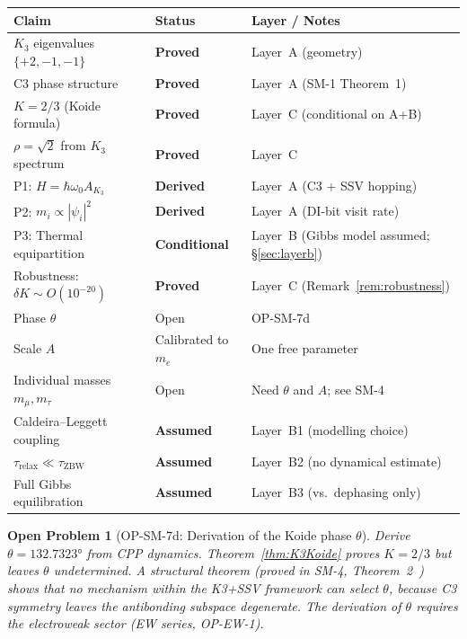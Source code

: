 \documentclass[11pt]{article}
\newtheorem{openproblem}{Open Problem}
\begin{document}
\begin{center}
\renewcommand{\arraystretch}{1.2}
\begin{tabular}{p{5.5cm}lp{5.5cm}}
\toprule
Claim & Status & Layer / Notes \\
\midrule
$K_3$ eigenvalues $\{+2,-1,-1\}$ & \textbf{Proved} & Layer~A (geometry) \\
C3 phase structure & \textbf{Proved} & Layer~A (SM-1 Theorem~1) \\
$K = 2/3$ (Koide formula) & \textbf{Proved} & Layer~C (conditional on A+B) \\
$\rho = \sqrt{2}$ from $K_3$ spectrum & \textbf{Proved} & Layer~C \\
P1: $H = \hbar\omega_0 A_{K_3}$ & \textbf{Derived} & Layer~A (C3 + SSV hopping) \\
P2: $m_i \propto |\psi_i|^2$ & \textbf{Derived} & Layer~A (DI-bit visit rate) \\
P3: Thermal equipartition & \textbf{Conditional} & Layer~B (Gibbs model assumed; \S\ref{sec:layerb}) \\
Robustness: $\delta K \sim O(10^{-20})$ & \textbf{Proved} & Layer~C (Remark~\ref{rem:robustness}) \\
Phase $\theta$ & Open & OP-SM-7d \\
Scale $A$ & Calibrated to $m_e$ & One free parameter \\
Individual masses $m_\mu, m_\tau$ & Open & Need $\theta$ and $A$; see SM-4 \\
Caldeira--Leggett coupling & \textbf{Assumed} & Layer~B1 (modelling choice) \\
$\tau_{\mathrm{relax}} \ll \tau_{\mathrm{ZBW}}$ & \textbf{Assumed} & Layer~B2 (no dynamical estimate) \\
Full Gibbs equilibration & \textbf{Assumed} & Layer~B3 (vs.\ dephasing only) \\
\bottomrule
\end{tabular}
\end{center}

\begin{openproblem}[OP-SM-7d: Derivation of the Koide phase $\theta$]
\label{op:theta}
Derive $\theta = 132.7323°$ from CPP dynamics.
Theorem~\ref{thm:K3Koide} proves $K = 2/3$ but leaves $\theta$
undetermined.  A structural theorem (proved in SM-4,
Theorem~2~\cite{abshier2026sm4}) shows that no mechanism within the
K3+SSV framework can select $\theta$, because C3 symmetry leaves
the antibonding subspace degenerate.  The derivation of $\theta$
requires the electroweak sector (EW series, OP-EW-1).
\end{openproblem}
\end{document}
